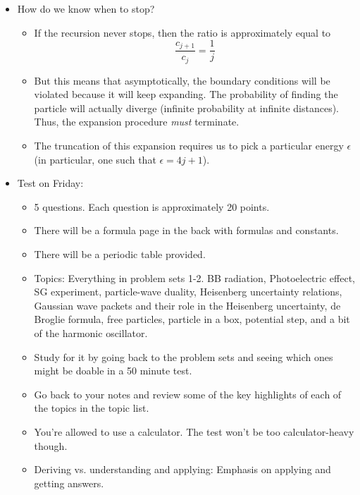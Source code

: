 \documentclass[../notes.tex]{subfiles}
\begin{document}
\begin{itemize}
    \item How do we know when to stop?
    \begin{itemize}
        \item If the recursion never stops, then the ratio is approximately equal to
        \begin{equation*}
            \frac{c_{j+1}}{c_j} = \frac{1}{j}
        \end{equation*}
        \item But this means that asymptotically, the boundary conditions will be violated because it will keep expanding. The probability of finding the particle will actually diverge (infinite probability at infinite distances). Thus, the expansion procedure \emph{must} terminate.
        \item The truncation of this expansion requires us to pick a particular energy $\epsilon$ (in particular, one such that $\epsilon=4j+1$).
    \end{itemize}
    \item Test on Friday:
    \begin{itemize}
        \item 5 questions. Each question is approximately 20 points.
        \item There will be a formula page in the back with formulas and constants.
        \item There will be a periodic table provided.
        \item Topics: Everything in problem sets 1-2. BB radiation, Photoelectric effect, SG experiment, particle-wave duality, Heisenberg uncertainty relations, Gaussian wave packets and their role in the Heisenberg uncertainty, de Broglie formula, free particles, particle in a box, potential step, and a bit of the harmonic oscillator.
        \item Study for it by going back to the problem sets and seeing which ones might be doable in a 50 minute test.
        \item Go back to your notes and review some of the key highlights of each of the topics in the topic list.
        \item You're allowed to use a calculator. The test won't be too calculator-heavy though.
        \item Deriving vs. understanding and applying: Emphasis on applying and getting answers.
    \end{itemize}
\end{itemize}
\end{document}
